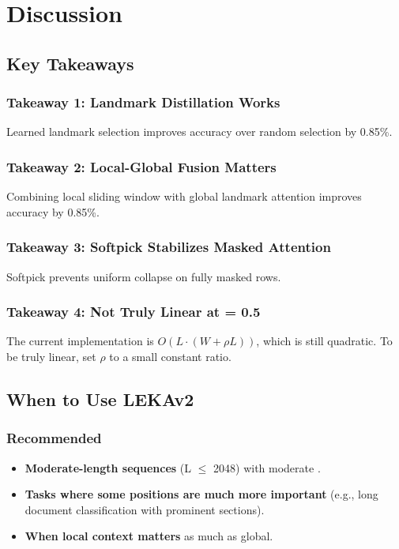 \section{Discussion}

\subsection{Key Takeaways}

\subsubsection{Takeaway 1: Landmark Distillation Works}

Learned landmark selection improves accuracy over random selection by 
0.85\%.

\subsubsection{Takeaway 2: Local-Global Fusion Matters}

Combining local sliding window with global landmark attention improves 
accuracy by 0.85\%.

\subsubsection{Takeaway 3: Softpick Stabilizes Masked Attention}

Softpick prevents uniform collapse on fully masked rows.

\subsubsection{Takeaway 4: Not Truly Linear at   = 0.5}

The current implementation is $O(L \cdot (W + \rho L))$, which is 
still quadratic. To be truly linear, set $\rho$ to a small constant 
ratio.

\subsection{When to Use LEKAv2}

\subsubsection{Recommended}
\begin{itemize}
\item \textbf{Moderate-length sequences} (L $\le$ 2048) with moderate  .
\item \textbf{Tasks where some positions are much more important} (e.g., long
  document classification with prominent sections).
\item \textbf{When local context matters} as much as global.

\end{itemize}
